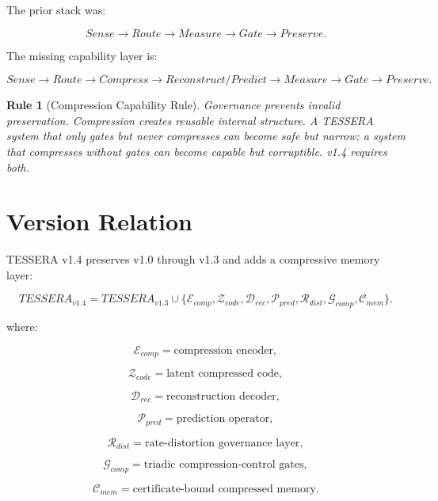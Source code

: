 \documentclass[12pt]{article}
\newtheorem{rulebox}{Rule}
\begin{document}
The prior stack was:

\[
Sense\rightarrow Route\rightarrow Measure\rightarrow Gate\rightarrow Preserve.
\]

The missing capability layer is:

\[
\boxed{
Sense\rightarrow Route\rightarrow Compress\rightarrow Reconstruct/Predict
\rightarrow Measure\rightarrow Gate\rightarrow Preserve.
}
\]

\begin{rulebox}[Compression Capability Rule]
Governance prevents invalid preservation. Compression creates reusable internal
structure. A TESSERA system that only gates but never compresses can become safe
but narrow; a system that compresses without gates can become capable but
corruptible. v1.4 requires both.
\end{rulebox}

\section{Version Relation}

TESSERA v1.4 preserves v1.0 through v1.3 and adds a compressive memory layer:

\[
\boxed{
TESSERA_{v1.4}
=
TESSERA_{v1.3}
\cup
\{\mathcal{E}_{comp},\mathcal{Z}_{code},\mathcal{D}_{rec},\mathcal{P}_{pred},
\mathcal{R}_{dist},\mathcal{G}_{comp},\mathcal{C}_{mem}\}.
}
\]

where:

\[
\mathcal{E}_{comp}=\text{compression encoder},
\]

\[
\mathcal{Z}_{code}=\text{latent compressed code},
\]

\[
\mathcal{D}_{rec}=\text{reconstruction decoder},
\]

\[
\mathcal{P}_{pred}=\text{prediction operator},
\]

\[
\mathcal{R}_{dist}=\text{rate-distortion governance layer},
\]

\[
\mathcal{G}_{comp}=\text{triadic compression-control gates},
\]

\[
\mathcal{C}_{mem}=\text{certificate-bound compressed memory}.
\]
\end{document}
